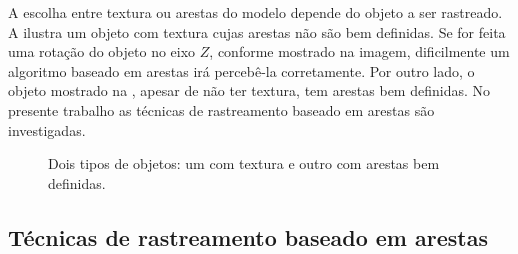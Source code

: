 A escolha entre textura ou arestas do modelo depende do objeto a ser rastreado. A  ilustra um objeto com textura cujas arestas não são bem definidas. Se for feita uma rotação do objeto no eixo $Z$, conforme mostrado na imagem, dificilmente um algoritmo baseado em arestas irá percebê-la corretamente. Por outro lado, o objeto mostrado na , apesar de não ter textura, tem arestas bem definidas. No presente trabalho as técnicas de rastreamento baseado em arestas são investigadas.

\begin{figure}[!ht]
	\centerline{
		\hfil
	}
	\caption{Dois tipos de objetos: um com textura e outro com arestas bem definidas.}
\end{figure}

\subsection{Técnicas de rastreamento baseado em arestas}

